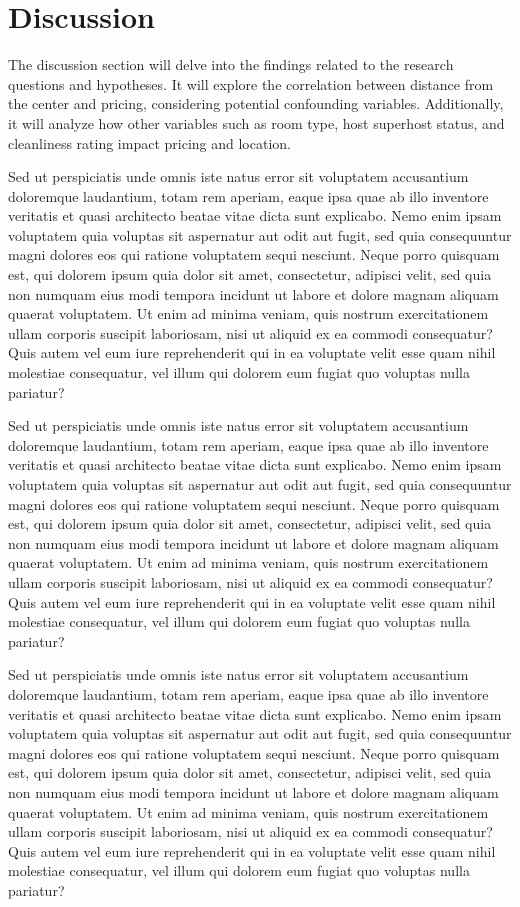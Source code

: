 \documentclass[10pt, conference, compsocconf]{IEEEtran}
\begin{document}
\section{Discussion}
The discussion section will delve into the findings related to the research questions and hypotheses. 
It will explore the correlation between distance from the center and pricing, considering potential confounding variables. 
Additionally, it will analyze how other variables such as room type, host superhost status, and cleanliness rating impact pricing and location.

Sed ut perspiciatis unde omnis iste natus error sit voluptatem accusantium doloremque laudantium, totam rem aperiam, eaque ipsa quae ab illo inventore veritatis et quasi architecto beatae vitae dicta sunt explicabo. 
Nemo enim ipsam voluptatem quia voluptas sit aspernatur aut odit aut fugit, sed quia consequuntur magni dolores eos qui ratione voluptatem sequi nesciunt. Neque porro quisquam est, qui dolorem ipsum quia dolor sit amet, consectetur, adipisci velit, sed quia non numquam eius modi tempora incidunt ut labore et dolore magnam aliquam quaerat voluptatem. 
Ut enim ad minima veniam, quis nostrum exercitationem ullam corporis suscipit laboriosam, nisi ut aliquid ex ea commodi consequatur? Quis autem vel eum iure reprehenderit qui in ea voluptate velit esse quam nihil molestiae consequatur, vel illum qui dolorem eum fugiat quo voluptas nulla pariatur?

Sed ut perspiciatis unde omnis iste natus error sit voluptatem accusantium doloremque laudantium, totam rem aperiam, eaque ipsa quae ab illo inventore veritatis et quasi architecto beatae vitae dicta sunt explicabo. 
Nemo enim ipsam voluptatem quia voluptas sit aspernatur aut odit aut fugit, sed quia consequuntur magni dolores eos qui ratione voluptatem sequi nesciunt. Neque porro quisquam est, qui dolorem ipsum quia dolor sit amet, consectetur, adipisci velit, sed quia non numquam eius modi tempora incidunt ut labore et dolore magnam aliquam quaerat voluptatem. 
Ut enim ad minima veniam, quis nostrum exercitationem ullam corporis suscipit laboriosam, nisi ut aliquid ex ea commodi consequatur? Quis autem vel eum iure reprehenderit qui in ea voluptate velit esse quam nihil molestiae consequatur, vel illum qui dolorem eum fugiat quo voluptas nulla pariatur?

Sed ut perspiciatis unde omnis iste natus error sit voluptatem accusantium doloremque laudantium, totam rem aperiam, eaque ipsa quae ab illo inventore veritatis et quasi architecto beatae vitae dicta sunt explicabo. 
Nemo enim ipsam voluptatem quia voluptas sit aspernatur aut odit aut fugit, sed quia consequuntur magni dolores eos qui ratione voluptatem sequi nesciunt. Neque porro quisquam est, qui dolorem ipsum quia dolor sit amet, consectetur, adipisci velit, sed quia non numquam eius modi tempora incidunt ut labore et dolore magnam aliquam quaerat voluptatem. 
Ut enim ad minima veniam, quis nostrum exercitationem ullam corporis suscipit laboriosam, nisi ut aliquid ex ea commodi consequatur? Quis autem vel eum iure reprehenderit qui in ea voluptate velit esse quam nihil molestiae consequatur, vel illum qui dolorem eum fugiat quo voluptas nulla pariatur?
\end{document}
